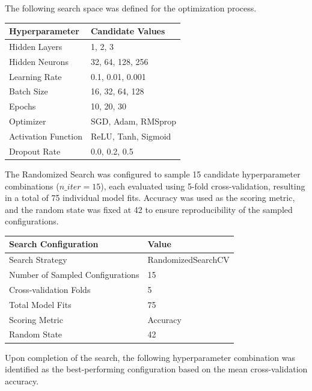 \documentclass[11pt,a4paper]{article}
\begin{document}
The following search space was defined for the optimization process.

\begin{center}
\begin{tabular}{|p{5cm}|p{7cm}|}
\hline
\textbf{Hyperparameter} & \textbf{Candidate Values}\\
\hline
Hidden Layers & 1, 2, 3\\
\hline
Hidden Neurons & 32, 64, 128, 256\\
\hline
Learning Rate & 0.1, 0.01, 0.001\\
\hline
Batch Size & 16, 32, 64, 128\\
\hline
Epochs & 10, 20, 30\\
\hline
Optimizer & SGD, Adam, RMSprop\\
\hline
Activation Function & ReLU, Tanh, Sigmoid\\
\hline
Dropout Rate & 0.0, 0.2, 0.5\\
\hline
\end{tabular}
\end{center}

\vspace{0.3cm}

The Randomized Search was configured to sample 15 candidate hyperparameter combinations ($n\_iter=15$), each evaluated using 5-fold cross-validation, resulting in a total of 75 individual model fits. Accuracy was used as the scoring metric, and the random state was fixed at 42 to ensure reproducibility of the sampled configurations.

\begin{center}
\begin{tabular}{|p{6cm}|p{6cm}|}
\hline
\textbf{Search Configuration} & \textbf{Value}\\
\hline
Search Strategy & RandomizedSearchCV\\
\hline
Number of Sampled Configurations & 15\\
\hline
Cross-validation Folds & 5\\
\hline
Total Model Fits & 75\\
\hline
Scoring Metric & Accuracy\\
\hline
Random State & 42\\
\hline
\end{tabular}
\end{center}

\vspace{0.3cm}
\newpage
Upon completion of the search, the following hyperparameter combination was identified as the best-performing configuration based on the mean cross-validation accuracy.
\end{document}
